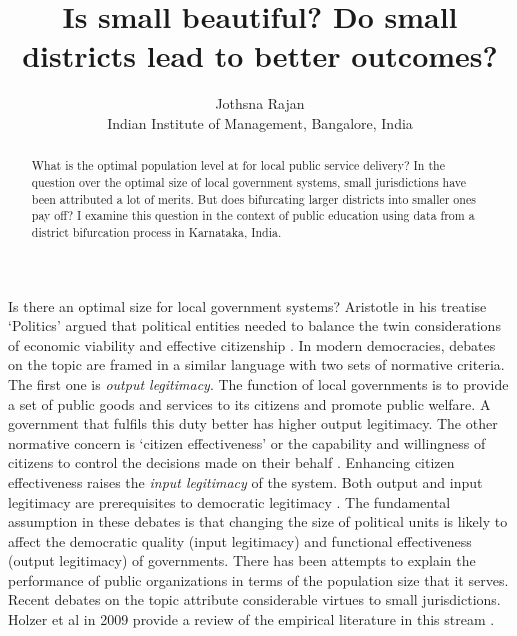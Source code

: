 \documentclass[12pt, a4paper]{article}
\title{Is small beautiful? Do small districts lead to better outcomes?}
\author{Jothsna Rajan \\
	\small{Indian Institute of Management, Bangalore, India}}
\begin{document}

	\maketitle
	\begin{abstract}
		What is the optimal population level at for local public service delivery? In the question over the optimal size of local government systems, small jurisdictions have been attributed a lot of merits. But does bifurcating larger districts into smaller ones pay off? I examine this question in the context of public education using data from a district bifurcation process in Karnataka, India.
	\end{abstract}
\paragraph{} Is there an optimal size for local government systems? Aristotle in his treatise `Politics' argued that political entities needed to balance the twin considerations of economic viability and effective citizenship \parencite{aristotle_politics_1984}. In modern democracies, debates on the topic are framed in a similar language with two sets of normative criteria. The first one is \textit{output legitimacy}. The function of local governments is to provide a set of public goods and services to its citizens and promote public welfare. A government that fulfils this duty better has higher output legitimacy. The other normative concern is `citizen effectiveness' or the capability and willingness of citizens to control the decisions made on their behalf \parencite{dahl_size_1973}. Enhancing citizen effectiveness raises the \textit{input legitimacy} of the system. Both output and input legitimacy are prerequisites to democratic legitimacy \parencite{scharpf_governing_1999}. The fundamental assumption in these debates is that changing the size of political units is likely to affect the democratic quality (input legitimacy) and functional effectiveness (output legitimacy) of governments. There has been attempts to explain the performance of public organizations in terms of the population size that it serves. Recent debates on the topic attribute considerable virtues to small jurisdictions. Holzer et al in 2009 provide a review of the empirical literature in this stream \parencite{holzer2009literature}. 
\end{document}
